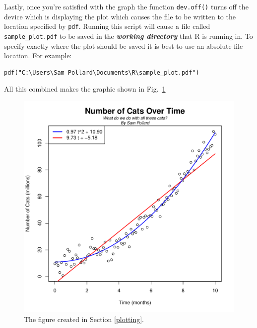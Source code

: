 \documentclass[12pt]{article}
\theoremstyle{remark}
\newcommand{\vocab}[1]{\textbf{\emph{#1}}}
\begin{document}
Lastly, once you're satisfied with the graph the function \verb|dev.off()| turns off the device which is displaying the plot which causes the file to be written to the location specified by \verb|pdf|. Running this script will cause a file called \verb|sample_plot.pdf| to be saved in the \vocab{working directory} that R is running in. To specify exactly where the plot should be saved it is best to use an absolute file location. For example:
\begin{verbatim}
pdf("C:\Users\Sam Pollard\Documents\R\sample_plot.pdf")
\end{verbatim}
All this combined makes the graphic shown in Fig.~\ref{sample_plot}

\begin{figure}[ht]
\centering
\includegraphics[scale=0.6]{sample_plot.pdf}
\caption{The figure created in Section \ref{plotting}.}
\label{sample_plot}
\end{figure}

\end{document}
